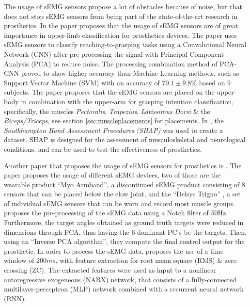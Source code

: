 \documentclass[../main.tex]{subfiles}
\begin{document}
The usage of sEMG sensors propose a lot of obstacles because of noise, but that does not stop sEMG sensors from being part of the state-of-the-art research in prosthetics.
In the paper \cite{KeunTaeKim2021} proposes that the usage of sEMG sensors are of great importance in upper-limb classification for prosthetics devices.
The paper uses sEMG sensors to classify reaching-to-grasping tasks using  a Convolutional Neural Network (CNN) after pre-processing the signal with Principal Component Analysis (PCA) to reduce noise.
The processing combination method of PCA-CNN proved to show higher accuracy than Machine Learning methods, such as Support Vector Machine (SVM) with an accuracy of $70.1 \pm 9.8\%$ based on 9 subjects.
The paper proposes that the sEMG sensors are placed on the upper-body in combination with the upper-arm for grasping intention classification, specifically, the muscles \textit{Pectoralis}, \textit{Trapezius}, \textit{Latissimus Dorsi} \& the \textit{Biceps/Triceps}, see section \ref{sec:muscleplacements} for placements.
In \cite{KeunTaeKim2021}, the \textit{Southhampton Hand Assessment Procedures (SHAP)} \cite{shap} was used to create a dataset.
SHAP is designed for the assessment of musculoskeletal and neurological conditions, and can be used to test the effectiveness of prosthetics.

Another paper that proposes the usage of sEMG sensors for prosthetics is \cite{Zhaolong2021}.
The paper proposes the usage of different sEMG devices, two of those are the wearable product ``Myo Armband'', \cite{myo} a discontinued sEMG product consisting of 8 sensors that can be placed below the elow joint, and the ``Delsys Trigno'' \cite{trigno}, a set of individual sEMG sensors that can be worn and record most muscle groups.
\cite{Zhaolong2021} proposes the pre-processing of the sEMG data using a Notch filter of 50Hz.
Furthermore, the target angles obtained as ground truth targets were reduced in dimensions through PCA, thus having the 6 dominant PC's be the targets.
Then, using an ``Inverse PCA algorithm'', they compute the final control output for the prosthetic.
In order to process the sEMG data, \cite{Zhaolong2021} proposes the use of a time window of $200ms$, with feature extraction for root mean square (RMS) \& zero crossing (ZC).
The extracted features were used as input to a nonlinear autoregressive exogeneous (NARX) network, that consists of a fully-connected multilayer-perceptron (MLP) network combined with a recurrent neural network (RNN). 
\end{document}
